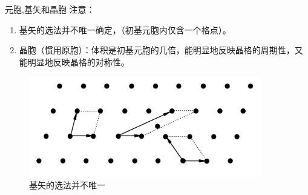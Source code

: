 \documentclass[trans]{beamer} %
\begin{document}
\begin{frame}{元胞,基矢和晶胞}
注意：
    \begin{enumerate}
            \item<2-| alert@2>[-] 基矢的选法并不唯一确定，（初基元胞内仅含一个格点）。
            \item<2-| alert@3>[-] 晶胞（惯用原胞）：体积是初基元胞的几倍，能明显地反映晶格的周期性，又能明显地反映晶格的对称性。
    \end{enumerate}
    \begin{figure}[htbp] 
            \centering\includegraphics[width=4in]{source/ch2/fg204.png} \caption{基矢的选法并不唯一}
            \end{figure}
\end{frame}
\end{document}
